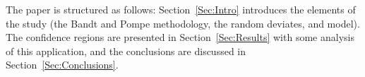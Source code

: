 The paper is structured as follows: Section~\ref{Sec:Intro} introduces the elements of the study (the Bandt and Pompe methodology, the random deviates, and model).
The confidence regions are presented in Section~\ref{Sec:Results} with some analysis of this application, and the conclusions are discussed in Section~\ref{Sec:Conclusions}.
